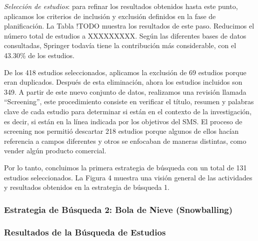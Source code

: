 \textit{Selección de estudios}: para refinar los resultados obtenidos hasta este punto, aplicamos los criterios de inclusión y exclusión definidos en la fase de planificación. La Tabla !TODO muestra los resultados de este paso. Reducimos el número total de estudios a XXXXXXXXX. Según las diferentes bases de datos consultadas, Springer todavía tiene la contribución más considerable, con el 43.30\% de los estudios.

De los 418 estudios seleccionados, aplicamos la exclusión de 69 estudios porque eran duplicados. Después de esta eliminación, ahora los estudios incluidos son 349. A partir de este nuevo conjunto de datos, realizamos una revisión llamada ``Screening'', este procedimiento consiste en verificar el título, resumen y palabras clave de cada estudio para determinar si están en el contexto de la investigación, es decir, si están en la línea indicada por los objetivos del SMS. El proceso de screening nos permitió descartar 218 estudios porque algunos de ellos hacían referencia a campos diferentes y otros se enfocaban de maneras distintas, como vender algún producto comercial.

Por lo tanto, concluimos la primera estrategia de búsqueda con un total de 131 estudios seleccionados. La Figura 4 muestra una visión general de las actividades y resultados obtenidos en la estrategia de búsqueda 1.

\subsubsection{Estrategia de Búsqueda 2: Bola de Nieve (Snowballing)}


\subsubsection{Resultados de la Búsqueda de Estudios}\label{subsubsec:resultados-busqueda}

